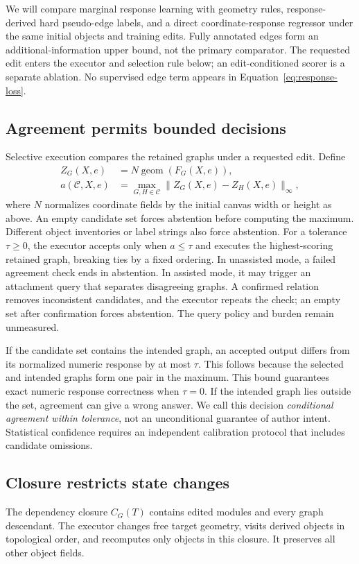 \documentclass{article}
\begin{document}
We will compare marginal response learning with geometry rules, response-derived hard pseudo-edge labels, and a direct coordinate-response regressor under the same initial objects and training edits. Fully annotated edges form an additional-information upper bound, not the primary comparator. The requested edit enters the executor and selection rule below; an edit-conditioned scorer is a separate ablation. No supervised edge term appears in Equation~\ref{eq:response-loss}.

\subsection{Agreement permits bounded decisions}
Selective execution compares the retained graphs under a requested edit. Define
\begin{align}
 Z_G(X,e)&=N\operatorname{geom}(F_G(X,e)),\\
 a(\mathcal C,X,e)&=\max_{G,H\in\mathcal C}\|Z_G(X,e)-Z_H(X,e)\|_\infty,
\end{align}
where $N$ normalizes coordinate fields by the initial canvas width or height as above. An empty candidate set forces abstention before computing the maximum. Different object inventories or label strings also force abstention. For a tolerance $\tau\geq0$, the executor accepts only when $a\leq\tau$ and executes the highest-scoring retained graph, breaking ties by a fixed ordering. In unassisted mode, a failed agreement check ends in abstention. In assisted mode, it may trigger an attachment query that separates disagreeing graphs. A confirmed relation removes inconsistent candidates, and the executor repeats the check; an empty set after confirmation forces abstention. The query policy and burden remain unmeasured.

If the candidate set contains the intended graph, an accepted output differs from its normalized numeric response by at most $\tau$. This follows because the selected and intended graphs form one pair in the maximum. This bound guarantees exact numeric response correctness when $\tau=0$. If the intended graph lies outside the set, agreement can give a wrong answer. We call this decision \emph{conditional agreement within tolerance}, not an unconditional guarantee of author intent. Statistical confidence requires an independent calibration protocol that includes candidate omissions.

\subsection{Closure restricts state changes}
The dependency closure $C_G(T)$ contains edited modules and every graph descendant. The executor changes free target geometry, visits derived objects in topological order, and recomputes only objects in this closure. It preserves all other object fields.
\end{document}
